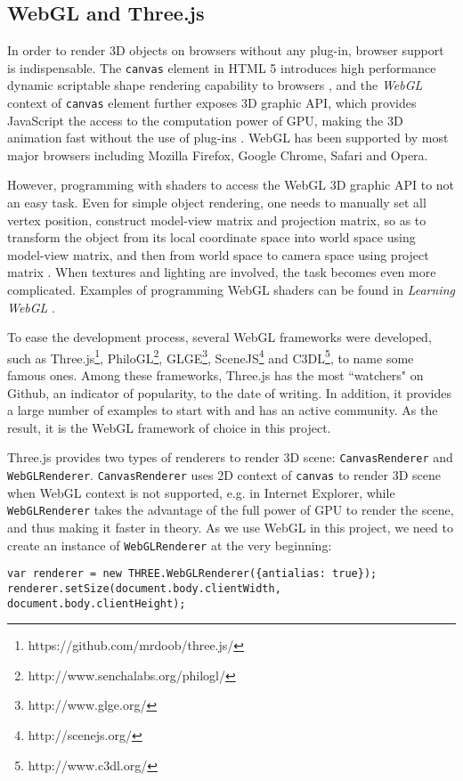 \subsection{WebGL and Three.js}
In order to render 3D objects on browsers without any plug-in, browser support is indispensable. The \texttt{canvas} element in HTML 5 introduces high performance dynamic scriptable shape rendering capability to browsers \cite{wiki:canvas}, and the \textit{WebGL} context of \texttt{canvas} element further exposes 3D graphic API, which provides JavaScript the access to the computation power of GPU, making the 3D animation fast without the use of plug-ins \cite{wiki:webgl}. WebGL has been supported by most major browsers including Mozilla Firefox, Google Chrome, Safari and Opera.

However, programming with shaders to access the WebGL 3D graphic API to not an easy task. Even for simple object rendering, one needs to manually set all vertex position, construct model-view matrix and projection matrix, so as to transform the object from its local coordinate space into world space using model-view matrix, and then from world space to camera space using project matrix \cite{Lengyel2012}. When textures and lighting are involved, the task becomes even more complicated. Examples of programming WebGL shaders can be found in \textit{Learning WebGL} \cite{learningWebGL}.

To ease the development process, several WebGL frameworks were developed, such as Three.js\footnote{https://github.com/mrdoob/three.js/}, PhiloGL\footnote{http://www.senchalabs.org/philogl/}, GLGE\footnote{http://www.glge.org/}, SceneJS\footnote{http://scenejs.org/} and C3DL\footnote{http://www.c3dl.org/}, to name some famous ones. Among these frameworks, Three.js has the most ``watchers" on Github, an indicator of popularity, to the date of writing. In addition, it provides a large number of examples to start with and has an active community. As the result, it is the WebGL framework of choice in this project.

Three.js provides two types of renderers to render 3D scene: \texttt{CanvasRenderer} and \texttt{WebGLRenderer}. \texttt{CanvasRenderer} uses 2D context of \texttt{canvas} to render 3D scene when WebGL context is not supported, e.g. in Internet Explorer, while \texttt{WebGLRenderer} takes the advantage of the full power of GPU to render the scene, and thus making it faster in theory. As we use WebGL in this project, we need to create an instance of \texttt{WebGLRenderer} at the very beginning:
\begin{lstlisting}
var renderer = new THREE.WebGLRenderer({antialias: true});
renderer.setSize(document.body.clientWidth, document.body.clientHeight);
\end{lstlisting}

